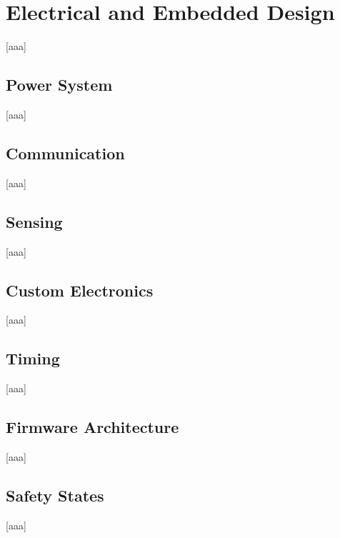\chapter{Electrical and Embedded Design} \label{sec:Electrical and Embedded Design}
    [aaa]

\section{Power System} \label{sec:Power System}
    [aaa]

\section{Communication} \label{sec:Communication}
    [aaa]

\section{Sensing} \label{sec:Sensing}
    [aaa]

\section{Custom Electronics} \label{sec:Custom Electronics}
    [aaa]

\section{Timing} \label{sec:Timing}
    [aaa]

\section{Firmware Architecture} \label{sec:Firmware Architecture}
    [aaa]

\section{Safety States} \label{sec:Safety States}
    [aaa]